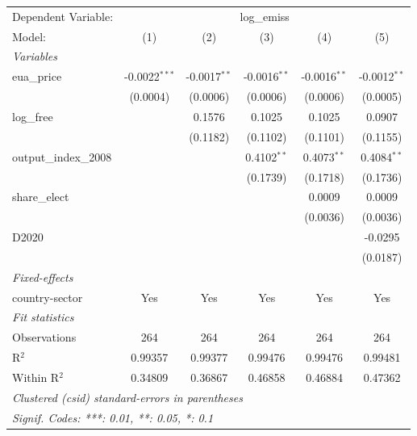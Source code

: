 
\begingroup
\centering
\begin{tabular}{lccccc}
   \tabularnewline \midrule \midrule
   Dependent Variable: & \multicolumn{5}{c}{log\_emiss}\\
   Model:                & (1)             & (2)            & (3)            & (4)            & (5)\\  
   \midrule
   \emph{Variables}\\
   eua\_price            & -0.0022$^{***}$ & -0.0017$^{**}$ & -0.0016$^{**}$ & -0.0016$^{**}$ & -0.0012$^{**}$\\   
                         & (0.0004)        & (0.0006)       & (0.0006)       & (0.0006)       & (0.0005)\\   
   log\_free             &                 & 0.1576         & 0.1025         & 0.1025         & 0.0907\\   
                         &                 & (0.1182)       & (0.1102)       & (0.1101)       & (0.1155)\\   
   output\_index\_2008   &                 &                & 0.4102$^{**}$  & 0.4073$^{**}$  & 0.4084$^{**}$\\   
                         &                 &                & (0.1739)       & (0.1718)       & (0.1736)\\   
   share\_elect          &                 &                &                & 0.0009         & 0.0009\\   
                         &                 &                &                & (0.0036)       & (0.0036)\\   
   D2020                 &                 &                &                &                & -0.0295\\   
                         &                 &                &                &                & (0.0187)\\   
   \midrule
   \emph{Fixed-effects}\\
   country-sector        & Yes             & Yes            & Yes            & Yes            & Yes\\  
   \midrule
   \emph{Fit statistics}\\
   Observations          & 264             & 264            & 264            & 264            & 264\\  
   R$^2$                 & 0.99357         & 0.99377        & 0.99476        & 0.99476        & 0.99481\\  
   Within R$^2$          & 0.34809         & 0.36867        & 0.46858        & 0.46884        & 0.47362\\  
   \midrule \midrule
   \multicolumn{6}{l}{\emph{Clustered (csid) standard-errors in parentheses}}\\
   \multicolumn{6}{l}{\emph{Signif. Codes: ***: 0.01, **: 0.05, *: 0.1}}\\
\end{tabular}
\par\endgroup


